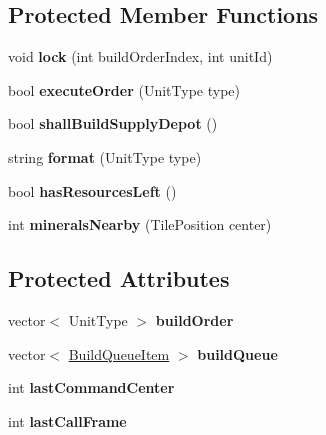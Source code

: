 \subsection*{Protected Member Functions}
\begin{DoxyCompactItemize}
\item 
\hypertarget{class_build_planner_aa031928adce8932c132d0ae375df3e65}{
void {\bfseries lock} (int buildOrderIndex, int unitId)}
\label{class_build_planner_aa031928adce8932c132d0ae375df3e65}

\item 
\hypertarget{class_build_planner_aed6e5d1227e3a81909c14f1b8f15fd11}{
bool {\bfseries executeOrder} (UnitType type)}
\label{class_build_planner_aed6e5d1227e3a81909c14f1b8f15fd11}

\item 
\hypertarget{class_build_planner_af593d01aacb88ca04d1bee4ad4e46072}{
bool {\bfseries shallBuildSupplyDepot} ()}
\label{class_build_planner_af593d01aacb88ca04d1bee4ad4e46072}

\item 
\hypertarget{class_build_planner_a69f73df0f94cc83618f4bfc4ab8eb26e}{
string {\bfseries format} (UnitType type)}
\label{class_build_planner_a69f73df0f94cc83618f4bfc4ab8eb26e}

\item 
\hypertarget{class_build_planner_a201d8e9d93a983f330a82340d9700402}{
bool {\bfseries hasResourcesLeft} ()}
\label{class_build_planner_a201d8e9d93a983f330a82340d9700402}

\item 
\hypertarget{class_build_planner_a87371ee4ad91e47563450835fef9a79a}{
int {\bfseries mineralsNearby} (TilePosition center)}
\label{class_build_planner_a87371ee4ad91e47563450835fef9a79a}

\end{DoxyCompactItemize}
\subsection*{Protected Attributes}
\begin{DoxyCompactItemize}
\item 
\hypertarget{class_build_planner_a6a82eab6b57bf053f05462e758a20171}{
vector$<$ UnitType $>$ {\bfseries buildOrder}}
\label{class_build_planner_a6a82eab6b57bf053f05462e758a20171}

\item 
\hypertarget{class_build_planner_a6576998dbc3deb8ebea28b2cb9e2732e}{
vector$<$ \hyperlink{struct_build_queue_item}{BuildQueueItem} $>$ {\bfseries buildQueue}}
\label{class_build_planner_a6576998dbc3deb8ebea28b2cb9e2732e}

\item 
\hypertarget{class_build_planner_ae5b832983d0ca87e4a06bfd5a3fe785e}{
int {\bfseries lastCommandCenter}}
\label{class_build_planner_ae5b832983d0ca87e4a06bfd5a3fe785e}

\item 
\hypertarget{class_build_planner_a0bc0567ce47480c68c4e93e808c53d17}{
int {\bfseries lastCallFrame}}
\label{class_build_planner_a0bc0567ce47480c68c4e93e808c53d17}

\end{DoxyCompactItemize}


